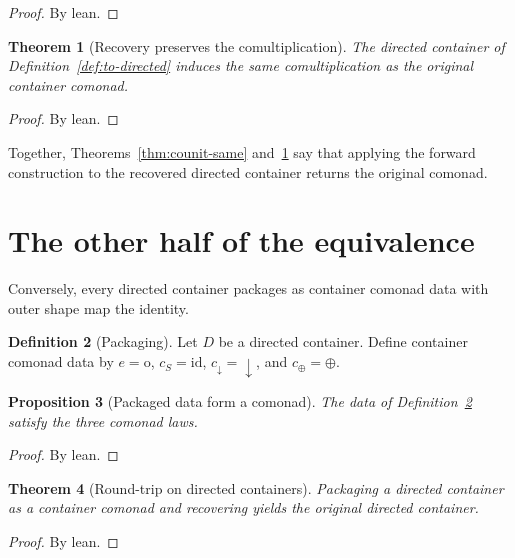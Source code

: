 \documentclass[11pt,a4paper]{article}
\theoremstyle{plain}
\newtheorem{theorem}{Theorem}[section]
\newtheorem{proposition}[theorem]{Proposition}
\theoremstyle{definition}
\newtheorem{definition}[theorem]{Definition}
\newcommand{\id}{\mathrm{id}}
\newcommand{\rootp}{\mathrm{o}}
\begin{document}
\begin{proof}
By lean.
\end{proof}

\begin{theorem}[Recovery preserves the comultiplication]\label{thm:comult-same}
The directed container of Definition~\ref{def:to-directed} induces the same
comultiplication as the original container comonad.
\end{theorem}

\begin{proof}
By lean.
\end{proof}

Together, Theorems~\ref{thm:counit-same} and~\ref{thm:comult-same} say that
applying the forward construction to the recovered directed container returns
the original comonad.

\section{The other half of the equivalence}

Conversely, every directed container packages as container comonad data with
outer shape map the identity.

\begin{definition}[Packaging]\label{def:packaging}
Let $D$ be a directed container. Define container comonad data by
$e = \rootp$, $c_S = \id$, $c_{\downarrow} = \downarrow$, and
$c_{\oplus} = \oplus$.
\end{definition}

\begin{proposition}[Packaged data form a comonad]\label{prop:packaged-is-comonad}
The data of Definition~\ref{def:packaging} satisfy the three comonad laws.
\end{proposition}

\begin{proof}
By lean.
\end{proof}

\begin{theorem}[Round-trip on directed containers]\label{thm:roundtrip}
Packaging a directed container as a container comonad and recovering yields
the original directed container.
\end{theorem}

\begin{proof}
By lean.
\end{proof}
\end{document}
